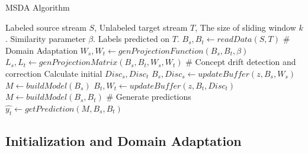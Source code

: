 \begin{algorithm}[h]  
\caption{MSDA Algorithm}  
\label{alg::overall}  
\begin{algorithmic}[1]  
\Require  
Labeled source stream $S$,
Unlabeled target stream $T$,  
The size of sliding window $k$.
Similarity parameter $\beta$.
\Ensure  
Labels predicted on $T$.
\State $B_s, B_t \gets readData(S,T)$
\State \# Domain Adaptation
\State $W_s, W_t \gets genProjectionFunction(B_s, B_t, \beta)$
\State $L_s, L_t \gets genProjectionMatrix(B_s, B_t, W_s, W_t)$
\State \# Concept drift detection and correction
\State Calculate initial $Disc_s, Disc_t$
\State $B_s, Disc_s \gets updateBuffer$$(z, B_s, W_s)$
\State $M \gets buildModel(B_s)$
\EndIf
\State $B_t, W_t \gets updateBuffer$$(z, B_t, Disc_t)$
\State $M \gets buildModel(B_s, B_t)$
\EndIf
\State \# Generate predictions
\State $\hat{y_{t}} \gets getPrediction(M,B_s, B_{t})$
\EndWhile

\end{algorithmic}  
\end{algorithm}

\subsection{Initialization and Domain Adaptation}

